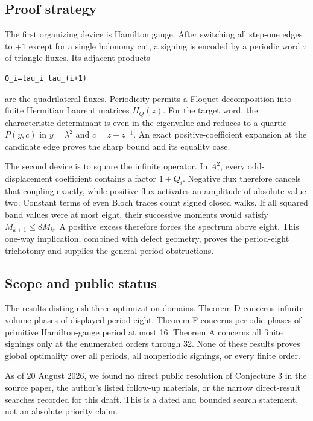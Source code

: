 \subsection{Proof strategy}

The first organizing device is Hamilton gauge. After switching all step-one
edges to \(+1\) except for a single holonomy cut, a signing is encoded by a
periodic word \(\tau\) of triangle fluxes. Its adjacent products

\begin{lstlisting}[language={}]
Q_i=tau_i tau_(i+1)
\end{lstlisting}

are the quadrilateral fluxes. Periodicity permits a Floquet decomposition into
finite Hermitian Laurent matrices \(H_Q(z)\). For the target word, the
characteristic determinant is even in the eigenvalue and reduces to a quartic
\(P(y,c)\) in \(y=\lambda^2\) and \(c=z+z^{-1}\). An exact positive-coefficient
expansion at the candidate edge proves the sharp bound and its equality case.

The second device is to square the infinite operator. In \(A_\tau^2\), every
odd-displacement coefficient contains a factor \(1+Q_i\). Negative flux
therefore cancels that coupling exactly, while positive flux activates an
amplitude of absolute value two. Constant terms of even Bloch traces count
signed closed walks. If all squared band values were at most eight, their
successive moments would satisfy \(M_{k+1}\le 8M_k\). A positive excess therefore
forces the spectrum above eight. This one-way implication, combined with
defect geometry, proves the period-eight trichotomy and supplies the general
period obstructions.

\subsection{Scope and public status}

The results distinguish three optimization domains. Theorem D concerns
infinite-volume phases of displayed period eight. Theorem F concerns periodic
phases of primitive Hamilton-gauge period at most 16. Theorem A concerns all
finite signings only at the enumerated orders through 32. None of these results
proves global optimality over all periods, all nonperiodic signings, or every
finite order.

As of 20 August 2026, we found no direct public resolution of Conjecture 3 in
the source paper, the author's listed follow-up materials, or the narrow
direct-result searches recorded for this draft. This is a dated and bounded
search statement, not an absolute priority claim.

